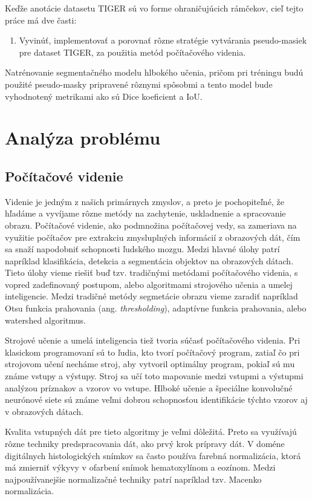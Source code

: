 Keďže anotácie datasetu TIGER sú vo forme ohraničujúcich rámčekov, cieľ tejto práce má dve časti:

\begin{enumerate}
    \item Vyvinúť, implementovať a porovnať rôzne stratégie vytvárania pseudo-masiek pre dataset TIGER, za použitia metód počítačového videnia.
\end{enumerate} Natrénovanie segmentačného modelu hlbokého učenia, pričom pri tréningu budú použité pseudo-masky pripravené rôznymi spôsobmi a tento model bude vyhodnotený metrikami ako sú Dice koeficient a IoU.

\section{Analýza problému}

\subsection{Počítačové videnie}
Videnie je jedným z našich primárnych zmyslov, a preto je pochopiteľné, že hľadáme a vyvíjame rôzne metódy na zachytenie, uskladnenie a spracovanie obrazu. Počítačové videnie, ako podmnožina počítačovej vedy, sa zameriava na využitie počítačov pre extrakciu zmysluplných informácií z obrazových dát, čím sa snaží napodobniť schopnosti ľudského mozgu. Medzi hlavné úlohy patrí napríklad klasifikácia, detekcia a segmentácia objektov na obrazových dátach. Tieto úlohy vieme riešiť buď tzv. tradičnými metódami počítačového videnia, s vopred zadefinovaný postupom, alebo algoritmami strojového učenia a umelej inteligencie. Medzi tradičné metódy segmetácie obrazu vieme zaradiť napríklad Otsu funkcia prahovania (ang. \textit{thresholding}), adaptívne funkcia prahovania, alebo watershed algoritmus.

Strojové učenie a umelá inteligencia tiež tvoria súčasť počítačového videnia. Pri klasickom programovaní sú to ľudia, kto tvorí počítačový program, zatiaľ čo pri strojovom učení necháme stroj, aby vytvoril optimálny program, pokiaľ sú mu známe vstupy a výstupy. Stroj sa učí toto mapovanie medzi vstupmi a výstupmi analýzou príznakov a vzorov vo vstupe. Hlboké učenie a špeciálne konvolučné neurónové siete sú známe veľmi dobrou schopnosťou identifikácie týchto vzorov aj v obrazových dátach.

Kvalita vstupných dát pre tieto algoritmy je veľmi dôležitá. Preto sa využívajú rôzne techniky predspracovania dát, ako prvý krok prípravy dát. V doméne digitálnych histologických snímkov sa často používa farebná normalizácia, ktorá má zmierniť výkyvy v ofarbení snímok hematoxylínom a eozínom. Medzi najpoužívanejšie normalizačné techniky patrí napríklad tzv. Macenko normalizácia.

